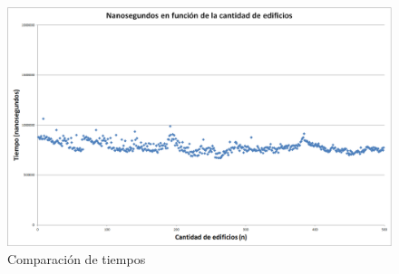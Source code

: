 \begin{figure}[H]
	\centering
	\includegraphics[scale=0.45]{Imagenes/Ej2/exp2_sep_const.png}
	\caption{Comparación de tiempos}
	\label{fig:ej1_comple2}
\end{figure}
